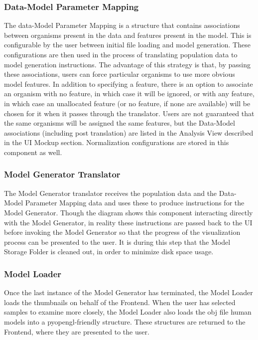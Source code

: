 \documentclass[letterpaper,10pt, onecolumn, draftclsnofoot]{IEEEtran}
\begin{document}
\subsubsection{Data-Model Parameter Mapping}
The data-Model Parameter Mapping is a structure that contains associations between organisms present in the data and features present in the model. This is configurable by the user between initial file loading and model generation. These configurations are then used in the process of translating population data to model generation instructions. The advantage of this strategy is that, by passing these associations, users can force particular organisms to use more obvious model features. In addition to specifying a feature, there is an option to associate an organism with no feature, in which case it will be ignored, or with any feature, in which case an unallocated feature (or no feature, if none are available) will be chosen for it when it passes through the translator. Users are not guaranteed that the same organisms will be assigned the same features, but the Data-Model associations (including post translation) are listed in the Analysis View described in the UI Mockup section. Normalization configurations are stored in this component as well.

\subsubsection{Model Generator Translator}

The Model Generator translator receives the population data and the Data-Model Parameter Mapping data and uses these to produce instructions for the Model Generator. Though the diagram shows this component interacting directly with the Model Generator, in reality these instructions are passed back to the UI before invoking the Model Generator so that the progress of the visualization process can be presented to the user. It is during this step that the Model Storage Folder is cleaned out, in order to minimize disk space usage.

\subsubsection{Model Loader}
Once the last instance of the Model Generator has terminated, the Model Loader loads the thumbnails on behalf of the Frontend. When the user has selected samples to examine more closely, the Model Loader also loads the obj file human models into a pyopengl-friendly structure. These structures are returned to the Frontend, where they are presented to the user.
\end{document}
